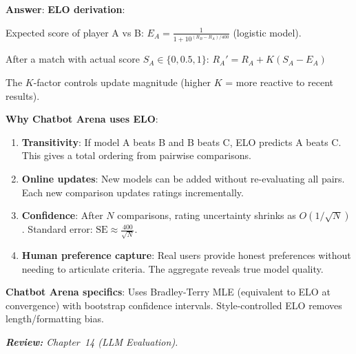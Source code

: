 \begin{questionbox}
\textbf{Answer}: \textbf{ELO derivation}:

Expected score of player A vs B: $E_A = \frac{1}{1 + 10^{(R_B - R_A)/400}}$ (logistic model).

After a match with actual score $S_A \in \{0, 0.5, 1\}$: $R_A' = R_A + K(S_A - E_A)$

The $K$-factor controls update magnitude (higher $K$ = more reactive to recent results).

\textbf{Why Chatbot Arena uses ELO}:

\begin{enumerate}
  \item \textbf{Transitivity}: If model A beats B and B beats C, ELO predicts A beats C. This gives a total ordering from pairwise comparisons.
  \item \textbf{Online updates}: New models can be added without re-evaluating all pairs. Each new comparison updates ratings incrementally.
  \item \textbf{Confidence}: After $N$ comparisons, rating uncertainty shrinks as $O(1/\sqrt{N})$. Standard error: $\text{SE} \approx \frac{400}{\sqrt{N}}$.
  \item \textbf{Human preference capture}: Real users provide honest preferences without needing to articulate criteria. The aggregate reveals true model quality.
\end{enumerate}

\textbf{Chatbot Arena specifics}: Uses Bradley-Terry MLE (equivalent to ELO at convergence) with bootstrap confidence intervals. Style-controlled ELO removes length/formatting bias.

\emph{\textbf{Review:} Chapter~14 (LLM Evaluation).}
\end{questionbox}

